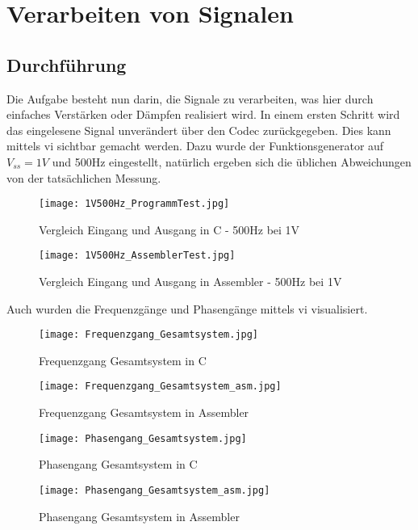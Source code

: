 \chapter{Verarbeiten von Signalen}
\section{Durchf\"uhrung}
Die Aufgabe besteht nun darin, die Signale zu verarbeiten, was hier durch einfaches Verstärken oder Dämpfen realisiert wird.
In einem ersten Schritt wird das eingelesene Signal unverändert über den Codec zurückgegeben. Dies kann mittels \gls{vi} sichtbar gemacht werden. 
Dazu wurde der Funktionsgenerator auf \begin{math}V_{ss} = 1V\end{math} und 500Hz eingestellt, natürlich ergeben sich die üblichen Abweichungen von der tatsächlichen Messung.

\begin{figure}[h!]
  \centering
    \texttt{[image: 1V500Hz\_ProgrammTest.jpg]}
  \caption{Vergleich Eingang und Ausgang in C - 500Hz bei 1V}
  \label{fig:500HzC}
\end{figure}
\begin{figure}[h!]
  \centering
    \texttt{[image: 1V500Hz\_AssemblerTest.jpg]}
  \caption{Vergleich Eingang und Ausgang in Assembler - 500Hz bei 1V}
  \label{fig:500HzAss}
\end{figure}\pagebreak

Auch wurden die Frequenzgänge und Phasengänge mittels \gls{vi} visualisiert.

\begin{figure}[h!]
  \centering
    \texttt{[image: Frequenzgang\_Gesamtsystem.jpg]}
  \caption{Frequenzgang Gesamtsystem in C}
  \label{fig:FreqGGesC}
\end{figure}
\begin{figure}[h!]
  \centering
    \texttt{[image: Frequenzgang\_Gesamtsystem\_asm.jpg]}
  \caption{Frequenzgang Gesamtsystem in Assembler}
  \label{fig:FreqGGesAss}
\end{figure}
\begin{figure}[h!]
  \centering
    \texttt{[image: Phasengang\_Gesamtsystem.jpg]}
  \caption{Phasengang Gesamtsystem in C}
  \label{fig:PhaGGesC}
\end{figure}
\begin{figure}[h!]
  \centering
    \texttt{[image: Phasengang\_Gesamtsystem\_asm.jpg]}
  \caption{Phasengang Gesamtsystem in Assembler}
  \label{fig:PhaGGesAss}
\end{figure}


